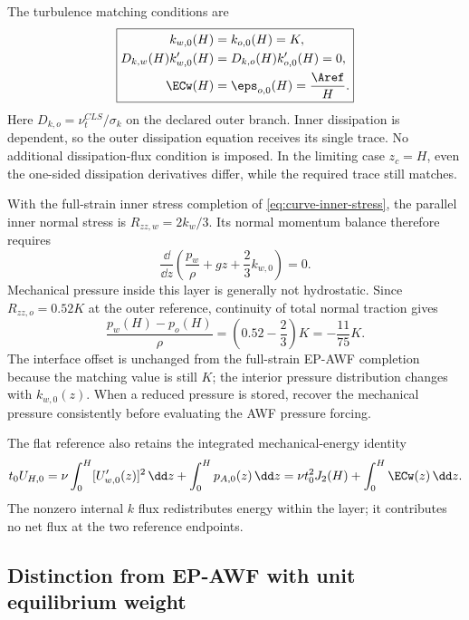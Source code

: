 The turbulence matching conditions are
\begin{equation}
 \boxed{\begin{aligned}
 k_{w,0}(H)&=k_{o,0}(H)=K,\\
 D_{k,w}(H)k_{w,0}'(H)
 &=D_{k,o}(H)k_{o,0}'(H)=0,\\
 \ECw(H)&=\eps_{o,0}(H)=\frac{\Aref}{H}.
 \end{aligned}}
 \label{eq:accepted-turbulence-match}
\end{equation}
Here $D_{k,o}=\nu_t^{CLS}/\sigma_k$ on the declared outer branch.
Inner dissipation is dependent, so the outer dissipation equation
receives its single trace. No additional dissipation-flux condition
is imposed. In the limiting case $z_c=H$, even the one-sided
dissipation derivatives differ, while the required trace still
matches.

With the full-strain inner stress completion of
\cref{eq:curve-inner-stress}, the parallel inner normal stress is
$R_{zz,w}=2k_w/3$. Its normal momentum balance therefore requires
\begin{equation}
 \frac{\dd}{\dd z}\left(
 \frac{p_w}{\rho}+gz+\frac23 k_{w,0}\right)=0.
 \label{eq:accepted-inner-pressure}
\end{equation}
Mechanical pressure inside this layer is generally not hydrostatic.
Since $R_{zz,o}=0.52K$ at the outer reference, continuity of total
normal traction gives
\begin{equation}
 \boxed{\frac{p_w(H)-p_o(H)}{\rho}
 =\left(0.52-\frac23\right)K=-\frac{11}{75}K.}
 \label{eq:accepted-pressure-jump}
\end{equation}
The interface offset is unchanged from the full-strain EP-AWF
completion because the matching value is still $K$; the interior
pressure distribution changes with $k_{w,0}(z)$.
When a reduced pressure is stored, recover the mechanical pressure
consistently before evaluating the AWF pressure forcing.

The flat reference also retains the integrated mechanical-energy
identity
\begin{equation}
 t_0 U_{H,0}
 =\nu\int_0^H[U_{w,0}'(z)]^2\,\dd z
  +\int_0^H p_{A,0}(z)\,\dd z
 =\nu t_0^2J_2(H)+\int_0^H\ECw(z)\,\dd z.
 \label{eq:accepted-energy}
\end{equation}
The nonzero internal $k$ flux redistributes energy within the layer;
it contributes no net flux at the two reference endpoints.

\subsection{Distinction from EP-AWF with unit equilibrium weight}
\label{app:accepted-awf-versus-ep}

